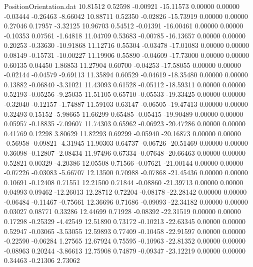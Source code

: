 \begin{filecontents}{PositionOrientation.dat}
  10.81512    0.52598   -0.00921   -15.11573    0.00000    0.00000   -0.03444   -0.26463   -8.66042
  10.88711    0.52350   -0.02826   -15.73919    0.00000    0.00000    0.27046    0.17957   -3.32125
  10.96703    0.54512   -0.01391   -16.00461    0.00000    0.00000   -0.10353    0.07561   -1.64818
  11.04709    0.53683   -0.00785   -16.13657    0.00000    0.00000    0.20253   -0.33630  -10.91868
  11.12716    0.55304   -0.03478   -17.01083    0.00000    0.00000    0.08149   -0.15731  -10.00227
  11.19906    0.55890   -0.04609   -17.73000    0.00000    0.00000    0.60135    0.04450    1.86853
  11.27904    0.60700   -0.04253   -17.58055    0.00000    0.00000   -0.02144   -0.04579   -9.69113
  11.35894    0.60529   -0.04619   -18.35480    0.00000    0.00000    0.13882   -0.06840   -3.31021
  11.43093    0.61528   -0.05112   -18.59311    0.00000    0.00000    0.52193   -0.05256   -9.25035
  11.51105    0.65710   -0.05533   -19.33425    0.00000    0.00000   -0.32040   -0.12157   -1.74887
  11.59103    0.63147   -0.06505   -19.47413    0.00000    0.00000    0.32493    0.15152   -5.98665
  11.66299    0.65485   -0.05415   -19.90489    0.00000    0.00000    0.05957   -0.18835   -7.09607
  11.74303    0.65962   -0.06923   -20.47286    0.00000    0.00000    0.41769    0.12298    3.80629
  11.82293    0.69299   -0.05940   -20.16873    0.00000    0.00000   -0.56958   -0.09821   -4.31945
  11.90303    0.64737   -0.06726   -20.51469    0.00000    0.00000    0.36098   -0.12807   -2.08434
  11.97496    0.67334   -0.07648   -20.66463    0.00000    0.00000    0.52821    0.00329   -4.20386
  12.05508    0.71566   -0.07621   -21.00144    0.00000    0.00000   -0.07226   -0.03083   -5.66707
  12.13500    0.70988   -0.07868   -21.45436    0.00000    0.00000    0.10691   -0.12408    0.71551
  12.21500    0.71844   -0.08860   -21.39713    0.00000    0.00000    0.04993    0.09462  -12.26013
  12.28712    0.72204   -0.08178   -22.28142    0.00000    0.00000   -0.06484   -0.11467   -0.75661
  12.36696    0.71686   -0.09093   -22.34182    0.00000    0.00000    0.03027    0.08771    0.33286
  12.44699    0.71928   -0.08392   -22.31519    0.00000    0.00000    0.17298   -0.25329   -4.42549
  12.51890    0.73172   -0.10213   -22.63345    0.00000    0.00000    0.52947   -0.03065   -3.53055
  12.59893    0.77409   -0.10458   -22.91597    0.00000    0.00000   -0.22590   -0.06284    1.27565
  12.67924    0.75595   -0.10963   -22.81352    0.00000    0.00000   -0.08963    0.20244   -3.86613
  12.75908    0.74879   -0.09347   -23.12219    0.00000    0.00000    0.34463   -0.21306    2.73062

\end{filecontents}
